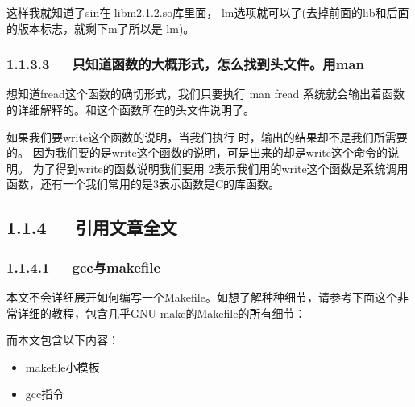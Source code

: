 \documentclass[letterpaper,12pt,english]{sphinxmanual}
\begin{document}
这样我就知道了sin在 libm\sphinxhyphen{}2.1.2.so库里面，
\sphinxhyphen{}lm选项就可以了(去掉前面的lib和后面的版本标志，就剩下m了所以是 \sphinxhyphen{}lm)。

\begin{sphinxVerbatim}[commandchars=\\\{\}]
    
\end{sphinxVerbatim}


\subsubsection{1.1.3.3   只知道函数的大概形式，怎么找到头文件。用man}
\label{\detokenize{001software/001install/make:man}}
想知道fread这个函数的确切形式，我们只要执行 man fread 系统就会输出着函数的详细解释的。和这个函数所在的头文件说明了。

如果我们要write这个函数的说明，当我们执行  时，输出的结果却不是我们所需要的。 因为我们要的是write这个函数的说明，可是出来的却是write这个命令的说明。
为了得到write的函数说明我们要用  2表示我们用的write这个函数是系统调用函数，还有一个我们常用的是3表示函数是C的库函数。


\subsection{1.1.4   引用文章全文}
\label{\detokenize{001software/001install/make:id5}}

\subsubsection{1.1.4.1   gcc与makefile}
\label{\detokenize{001software/001install/make:gccmakefile}}
\begin{DUlineblock}{0em}
\item[] 本文不会详细展开如何编写一个Makefile。如想了解种种细节，请参考下面这个非常详细的教程，包含几乎GNU
make的Makefile的所有细节：
\end{DUlineblock}


而本文包含以下内容：
\begin{itemize}
\item {} 
makefile小模板

\item {} 
gcc指令

\end{itemize}
\end{document}
